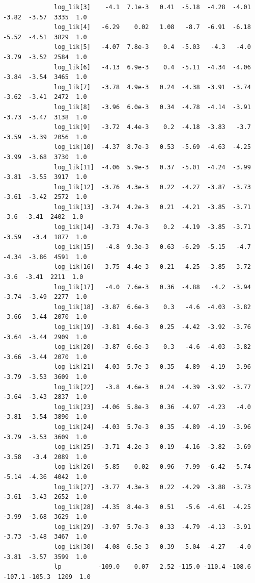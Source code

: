 \documentclass[11pt,a4paper,english]{article}
\begin{document}
\begin{itemize}
\begin{verbatim}
              log_lik[3]    -4.1  7.1e-3   0.41  -5.18  -4.28  -4.01  -3.82  -3.57  3335  1.0
              log_lik[4]   -6.29    0.02   1.08   -8.7  -6.91  -6.18  -5.52  -4.51  3829  1.0
              log_lik[5]   -4.07  7.8e-3    0.4  -5.03   -4.3   -4.0  -3.79  -3.52  2584  1.0
              log_lik[6]   -4.13  6.9e-3    0.4  -5.11  -4.34  -4.06  -3.84  -3.54  3465  1.0
              log_lik[7]   -3.78  4.9e-3   0.24  -4.38  -3.91  -3.74  -3.62  -3.41  2472  1.0
              log_lik[8]   -3.96  6.0e-3   0.34  -4.78  -4.14  -3.91  -3.73  -3.47  3138  1.0
              log_lik[9]   -3.72  4.4e-3    0.2  -4.18  -3.83   -3.7  -3.59  -3.39  2056  1.0
              log_lik[10]  -4.37  8.7e-3   0.53  -5.69  -4.63  -4.25  -3.99  -3.68  3730  1.0
              log_lik[11]  -4.06  5.9e-3   0.37  -5.01  -4.24  -3.99  -3.81  -3.55  3917  1.0
              log_lik[12]  -3.76  4.3e-3   0.22  -4.27  -3.87  -3.73  -3.61  -3.42  2572  1.0
              log_lik[13]  -3.74  4.2e-3   0.21  -4.21  -3.85  -3.71   -3.6  -3.41  2402  1.0
              log_lik[14]  -3.73  4.7e-3    0.2  -4.19  -3.85  -3.71  -3.59   -3.4  1877  1.0
              log_lik[15]   -4.8  9.3e-3   0.63  -6.29  -5.15   -4.7  -4.34  -3.86  4591  1.0
              log_lik[16]  -3.75  4.4e-3   0.21  -4.25  -3.85  -3.72   -3.6  -3.41  2211  1.0
              log_lik[17]   -4.0  7.6e-3   0.36  -4.88   -4.2  -3.94  -3.74  -3.49  2277  1.0
              log_lik[18]  -3.87  6.6e-3    0.3   -4.6  -4.03  -3.82  -3.66  -3.44  2070  1.0
              log_lik[19]  -3.81  4.6e-3   0.25  -4.42  -3.92  -3.76  -3.64  -3.44  2909  1.0
              log_lik[20]  -3.87  6.6e-3    0.3   -4.6  -4.03  -3.82  -3.66  -3.44  2070  1.0
              log_lik[21]  -4.03  5.7e-3   0.35  -4.89  -4.19  -3.96  -3.79  -3.53  3609  1.0
              log_lik[22]   -3.8  4.6e-3   0.24  -4.39  -3.92  -3.77  -3.64  -3.43  2837  1.0
              log_lik[23]  -4.06  5.8e-3   0.36  -4.97  -4.23   -4.0  -3.81  -3.54  3890  1.0
              log_lik[24]  -4.03  5.7e-3   0.35  -4.89  -4.19  -3.96  -3.79  -3.53  3609  1.0
              log_lik[25]  -3.71  4.2e-3   0.19  -4.16  -3.82  -3.69  -3.58   -3.4  2089  1.0
              log_lik[26]  -5.85    0.02   0.96  -7.99  -6.42  -5.74  -5.14  -4.36  4042  1.0
              log_lik[27]  -3.77  4.3e-3   0.22  -4.29  -3.88  -3.73  -3.61  -3.43  2652  1.0
              log_lik[28]  -4.35  8.4e-3   0.51   -5.6  -4.61  -4.25  -3.99  -3.68  3629  1.0
              log_lik[29]  -3.97  5.7e-3   0.33  -4.79  -4.13  -3.91  -3.73  -3.48  3467  1.0
              log_lik[30]  -4.08  6.5e-3   0.39  -5.04  -4.27   -4.0  -3.81  -3.57  3599  1.0
              lp__        -109.0    0.07   2.52 -115.0 -110.4 -108.6 -107.1 -105.3  1209  1.0
            \end{verbatim}
        \end{itemize}
\end{document}
